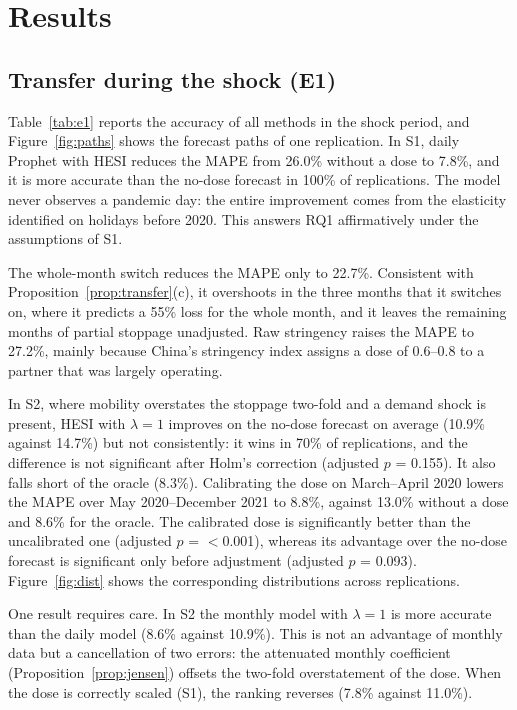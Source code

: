 \documentclass{article}
\theoremstyle{plain}
\theoremstyle{definition}
\theoremstyle{remark}
\begin{document}
\section{Results}\label{sec:results}
\subsection{Transfer during the shock (E1)}
Table~\ref{tab:e1} reports the accuracy of all methods in the shock period, and Figure~\ref{fig:paths} shows the forecast paths of one replication. In S1, daily Prophet with HESI reduces the MAPE from 26.0\% without a dose to 7.8\%, and it is more accurate than the no-dose forecast in 100\% of replications. The model never observes a pandemic day: the entire improvement comes from the elasticity identified on holidays before 2020. This answers RQ1 affirmatively under the assumptions of S1.

The whole-month switch reduces the MAPE only to 22.7\%. Consistent with Proposition~\ref{prop:transfer}(c), it overshoots in the three months that it switches on, where it predicts a 55\% loss for the whole month, and it leaves the remaining months of partial stoppage unadjusted. Raw stringency raises the MAPE to 27.2\%, mainly because China's stringency index assigns a dose of 0.6--0.8 to a partner that was largely operating.

In S2, where mobility overstates the stoppage two-fold and a demand shock is present, HESI with $\lambda=1$ improves on the no-dose forecast on average (10.9\% against 14.7\%) but not consistently: it wins in 70\% of replications, and the difference is not significant after Holm's correction (adjusted $p$ = 0.155). It also falls short of the oracle (8.3\%). Calibrating the dose on March--April 2020 lowers the MAPE over May 2020--December 2021 to 8.8\%, against 13.0\% without a dose and 8.6\% for the oracle. The calibrated dose is significantly better than the uncalibrated one (adjusted $p$ = $<$0.001), whereas its advantage over the no-dose forecast is significant only before adjustment (adjusted $p$ = 0.093). Figure~\ref{fig:dist} shows the corresponding distributions across replications.

One result requires care. In S2 the monthly model with $\lambda=1$ is more accurate than the daily model (8.6\% against 10.9\%). This is not an advantage of monthly data but a cancellation of two errors: the attenuated monthly coefficient (Proposition~\ref{prop:jensen}) offsets the two-fold overstatement of the dose. When the dose is correctly scaled (S1), the ranking reverses (7.8\% against 11.0\%).
\end{document}

